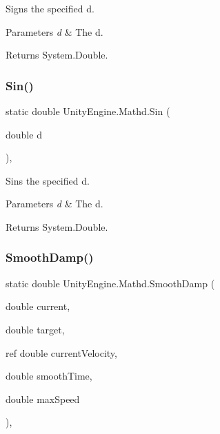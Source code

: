 Signs the specified d. 


\begin{DoxyParams}{Parameters}
{\em d} & The d.\\
\hline
\end{DoxyParams}
\begin{DoxyReturn}{Returns}
System.\+Double.
\end{DoxyReturn}
\mbox{\label{struct_unity_engine_1_1_mathd_a0b23cbb04fa0edc5dbaf0f37199999c6}} 
\subsubsection{\texorpdfstring{Sin()}{Sin()}}
{\footnotesize\ttfamily static double Unity\+Engine.\+Mathd.\+Sin (\begin{DoxyParamCaption}\item[{double}]{d }\end{DoxyParamCaption})\hspace{0.3cm}{\ttfamily [inline]}, {\ttfamily [static]}}



Sins the specified d. 


\begin{DoxyParams}{Parameters}
{\em d} & The d.\\
\hline
\end{DoxyParams}
\begin{DoxyReturn}{Returns}
System.\+Double.
\end{DoxyReturn}
\mbox{\label{struct_unity_engine_1_1_mathd_a85638a05cd967a88304f00d7a45d96f9}} 
\subsubsection{\texorpdfstring{Smooth\+Damp()}{SmoothDamp()}\hspace{0.1cm}{\footnotesize\ttfamily [1/3]}}
{\footnotesize\ttfamily static double Unity\+Engine.\+Mathd.\+Smooth\+Damp (\begin{DoxyParamCaption}\item[{double}]{current,  }\item[{double}]{target,  }\item[{ref double}]{current\+Velocity,  }\item[{double}]{smooth\+Time,  }\item[{double}]{max\+Speed }\end{DoxyParamCaption})\hspace{0.3cm}{\ttfamily [inline]}, {\ttfamily [static]}}



